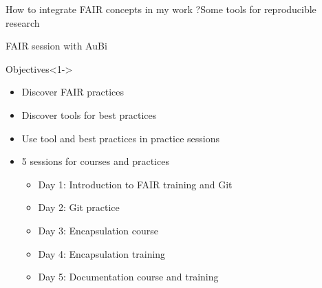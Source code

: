 \begin{frame}{How to integrate FAIR concepts in my work ?}{Some tools for reproducible research}

\end{frame}

\begin{frame}{FAIR session with AuBi}
\begin{block}{Objectives}<1->
\begin{itemize}
\item Discover FAIR practices
\item Discover tools for best practices
\item Use tool and best practices in practice sessions
\item 5 sessions for courses and practices
	\begin{itemize}
	\item Day 1: Introduction to FAIR training and Git
	\item Day 2: Git practice
	\item Day 3: Encapsulation course
	\item Day 4: Encapsulation training
	\item Day 5: Documentation course and training
	\end{itemize}
\end{itemize}
\end{block}
\end{frame}

